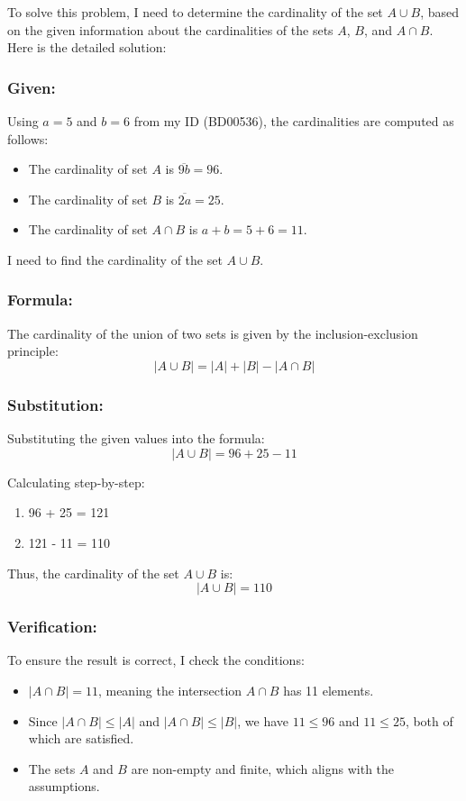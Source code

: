 \documentclass[12pt, a4paper, twoside]{report} %
\begin{document}
  To solve this problem, I need to determine the cardinality of the set $A \cup B$, based on the given information about the cardinalities of the sets $A$, $B$, and $A \cap B$. Here is the detailed solution:

\subsubsection*{Given:}
  Using \(a = 5\) and \(b = 6\) from my ID (BD00536), the cardinalities are computed as follows:
  \begin{itemize}
    \item The cardinality of set \(A\) is \(\overline{9b} = 96\).
    \item The cardinality of set \(B\) is \(\overline{2a} = 25\).
    \item The cardinality of set \(A \cap B\) is \(a + b = 5 + 6 = 11\).
  \end{itemize}
  I need to find the cardinality of the set \(A \cup B\).

\subsubsection*{Formula:}
  The cardinality of the union of two sets is given by the inclusion-exclusion principle:
  \[
  |A \cup B| = |A| + |B| - |A \cap B|
  \]

\subsubsection*{Substitution:}
  Substituting the given values into the formula:
  \[
  |A \cup B| = 96 + 25 - 11
  \]

  Calculating step-by-step:
  \begin{enumerate}
    \item 96 + 25 = 121
    \item 121 - 11 = 110
  \end{enumerate}


  Thus, the cardinality of the set \( A \cup B \) is:
  \[
  |A \cup B| = 110
  \]

\subsubsection*{Verification:}
  To ensure the result is correct, I check the conditions:

\begin{itemize}
  \item \( |A \cap B| = 11 \), meaning the intersection \( A \cap B \) has 11 elements.
  \item Since \( |A \cap B| \leq |A| \) and \( |A \cap B| \leq |B| \), we have \( 11 \leq 96 \) and \( 11 \leq 25 \), both of which are satisfied.
  \item The sets \( A \) and \( B \) are non-empty and finite, which aligns with the assumptions.
\end{itemize}
\end{document}
